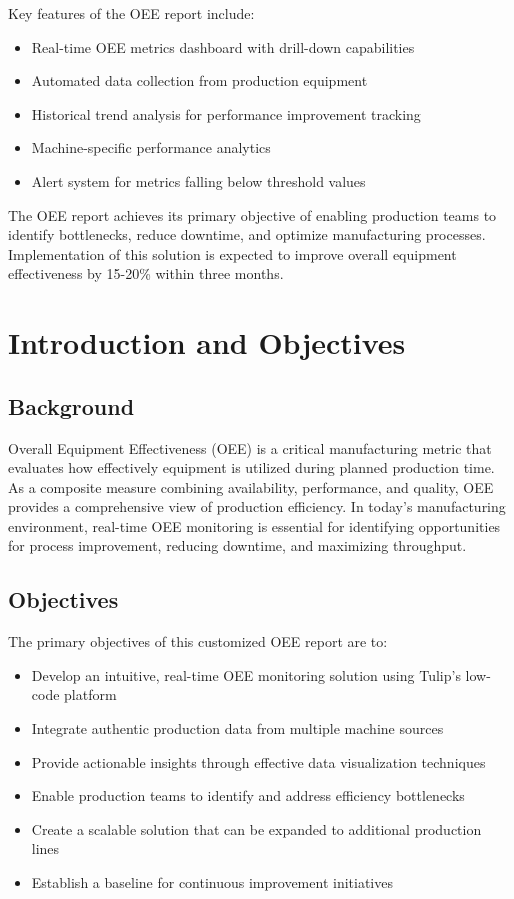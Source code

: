 \documentclass[11pt,a4paper]{article}
\begin{document}
Key features of the OEE report include:

\begin{itemize}
    \item Real-time OEE metrics dashboard with drill-down capabilities
    \item Automated data collection from production equipment
    \item Historical trend analysis for performance improvement tracking
    \item Machine-specific performance analytics
    \item Alert system for metrics falling below threshold values
\end{itemize}

The OEE report achieves its primary objective of enabling production teams to identify bottlenecks, reduce downtime, and optimize manufacturing processes. Implementation of this solution is expected to improve overall equipment effectiveness by 15-20\% within three months.

\section{Introduction and Objectives}

\subsection{Background}
Overall Equipment Effectiveness (OEE) is a critical manufacturing metric that evaluates how effectively equipment is utilized during planned production time. As a composite measure combining availability, performance, and quality, OEE provides a comprehensive view of production efficiency. In today's manufacturing environment, real-time OEE monitoring is essential for identifying opportunities for process improvement, reducing downtime, and maximizing throughput.

\subsection{Objectives}
The primary objectives of this customized OEE report are to:

\begin{itemize}
    \item Develop an intuitive, real-time OEE monitoring solution using Tulip's low-code platform
    \item Integrate authentic production data from multiple machine sources
    \item Provide actionable insights through effective data visualization techniques
    \item Enable production teams to identify and address efficiency bottlenecks
    \item Create a scalable solution that can be expanded to additional production lines
    \item Establish a baseline for continuous improvement initiatives
\end{itemize}
\end{document}
